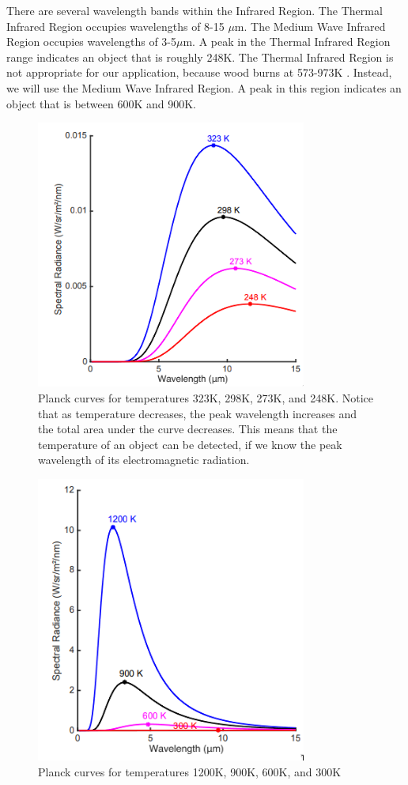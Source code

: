 \documentclass[12pt,journal,compsoc]{IEEEtran}
\begin{document}
There are several wavelength bands within the Infrared Region. The Thermal Infrared Region occupies wavelengths of 8-15 $\mu$m. 
The Medium Wave Infrared Region occupies wavelengths of 3-5$\mu$m. A peak in the Thermal Infrared Region range indicates an object that is roughly 248K. 
The Thermal Infrared Region is not appropriate for our application, because wood burns at 573-973K \cite{estimating_wildfire}.
Instead, we will use the Medium Wave Infrared Region. 
A peak in this region indicates an object that is between 600K and 900K.

\begin{figure}[h]
\centering
\includegraphics[width=3.5in]{plancka.png}
\caption{Planck curves for temperatures 323K, 298K, 273K, and 248K. Notice that as temperature decreases, the peak wavelength increases and the total area under the curve decreases. This means that the temperature of an object can be detected, if we know the peak wavelength of its electromagnetic radiation.}
\label{plancka_image}
\end{figure}

\begin{figure}[h]
\centering
\includegraphics[width=3.5in]{planckb.png}
\caption{Planck curves for temperatures 1200K, 900K, 600K, and 300K}
\label{planckb_image}
\end{figure}
\end{document}

